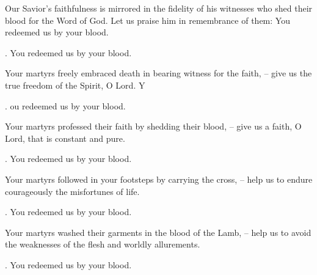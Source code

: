 \lettrine[loversize=0.15,lines=2]{O}{}ur Savior’s faithfulness is mirrored in the fidelity of his witnesses who shed their blood for the Word of God. Let us praise him in remembrance of them: You redeemed us by your blood.
\par \Rbar. You redeemed us by your blood.

Your martyrs freely embraced death in bearing witness for the faith,
– give us the true freedom of the Spirit, O Lord.
Y\par \Rbar. ou redeemed us by your blood.

Your martyrs professed their faith by shedding their blood,
– give us a faith, O Lord, that is constant and pure.
\par \Rbar. You redeemed us by your blood.

Your martyrs followed in your footsteps by carrying the cross,
– help us to endure courageously the misfortunes of life.
\par \Rbar. You redeemed us by your blood.

Your martyrs washed their garments in the blood of the Lamb,
– help us to avoid the weaknesses of the flesh and worldly allurements.
\par \Rbar. You redeemed us by your blood.
